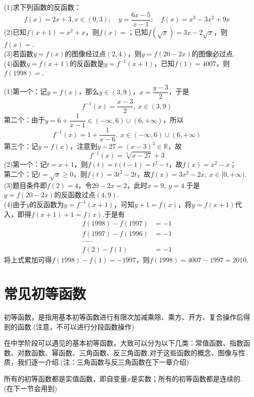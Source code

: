 \documentclass[lang=cn, zihao=5]{elegantbook}
\newcommand{\R}{\mathbb{R}}
\newcommand{\tk}{\uline{\hspace{4em}}}
\begin{document}
\begin{example}
	(1)求下列函数的反函数：$$f(x)=2x+3,x\in (0,3);\quad y=\frac{6x-5}{x-1};\quad f(x)=x^3-3x^2+9x$$
	(2)已知$f(x+1)=x^2+x$，则$f(x)=$\tk ；已知$f(\sqrt{x})=3x-2\sqrt{x}$，则$f(x)=$\tk . \\
	(3)若函数$y=f(x)$的图像经过点$(2,4)$，则$y=f(20-2x)$的图像必过点\tk . \\
	(4)函数$y=f(x+1)$的反函数是$y=f^{-1}(x+1)$，已知$f(1)=4007$，则$f(1998)=$\tk . \\
\end{example}
\begin{solution}
	(1)第一个：记$y=f(x)$，那么$y \in (3,9)$，$x=\dfrac{y-3}{2}$，于是$$f^{-1}(x)=\frac{x-3}{2},~x \in (3,9)$$
	第二个：由于$y=6+\dfrac{1}{x-1} \in (-\infty ,6)\cup (6,+\infty)$，所以$$f^{-1}(x) = 1+\frac{1}{x-6},~x \in (-\infty ,6)\cup (6,+\infty)$$
	第三个：记$y=f(x)$，注意到$y-27=(x-3)^3 \in \R$，故$$f^{-1}(x) = \sqrt[3]{x-27}+3$$
	(2)第一个：记$t=x+1$，则$f(t)=t(t-1)=t^2-t$，故$f(x)=x^2-x$； \\
	第二个：记$t=\sqrt{x} \geq 0$，则$f(t)=3t^2-2t$，故$f(x)=3x^2-2x,~x \in [0,+\infty )$. \\
	(3)题目条件即$f(2)=4$，令$20-2x=2$，此时$x=9,~y=4$.于是$y=f(20-2x)$的反函数过点$(4,9)$. \\
	(4)由于$y$的反函数为$y=f^{-1}(x+1)$，可知$y+1=f(x)$，将$y=f(x+1)$代入，即得$f(x+1)+1=f(x)$.于是有
	\begin{align*}
		f(1998)-f(1997)&=-1 \\
		f(1997)-f(1996)&=-1 \\
		\cdots \cdots \\
		f(2)-f(1)&=-1
	\end{align*}
	将上式累加可得$f(1998)-f(1)=-1997$，则$f(1998)=4007-1997=2010$.
\end{solution}

\newpage
\section{常见初等函数}

初等函数，是指用基本初等函数进行有限次加减乘除、乘方、开方、复合操作后得到的函数.(注意，不可以进行分段函数操作)

在中学阶段可以遇见的基本初等函数，大致可以分为以下几类：常值函数、指数函数、对数函数、幂函数、三角函数、反三角函数.对于这些函数的概念、图像与性质，我们逐一介绍.(注：三角函数与反三角函数在下一章介绍)

所有的初等函数都是实值函数，即自变量$x$是实数；所有的初等函数都是连续的.(在下一节会用到)
\end{document}
